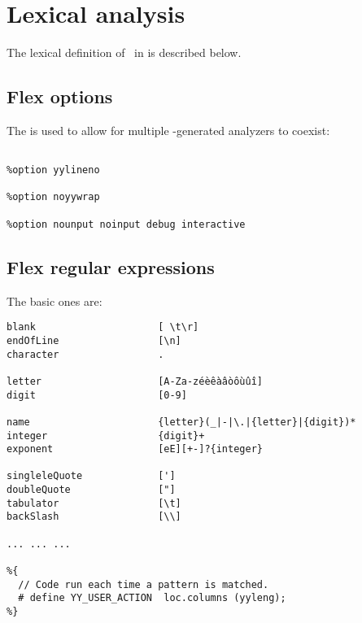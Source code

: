 \section{Lexical analysis}

The lexical definition of \mfslLang\ in  is described below.


\subsection{Flex options}
The  is used to allow for multiple \flex -generated analyzers to coexist:
\begin{lstlisting}[language=Flex]
%option prefix="mfsl"

%option yylineno

%option noyywrap

%option nounput noinput debug interactive
\end{lstlisting}


\subsection{Flex regular expressions}

The basic ones are:
\begin{lstlisting}[language=Flex]
blank                     [ \t\r]
endOfLine                 [\n]
character                 .

letter                    [A-Za-zéèêàâòôùûî]
digit                     [0-9]

name                      {letter}(_|-|\.|{letter}|{digit})*
integer                   {digit}+
exponent                  [eE][+-]?{integer}

singleleQuote             [']
doubleQuote               ["]
tabulator                 [\t]
backSlash                 [\\]

... ... ...

%{
  // Code run each time a pattern is matched.
  # define YY_USER_ACTION  loc.columns (yyleng);
%}
\end{lstlisting}

